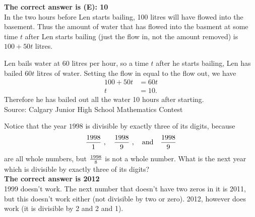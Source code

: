 \documentclass{article}
\begin{document}

\textbf{The correct answer is (E): 10}\\[1 ex]
In the two hours before Len starts bailing, 100 litres will have flowed into the basement. Thus the amount of water that has flowed into the basment at some time $t$ after Len starts bailing (just the flow in, not the amount removed) is $100+50t$ litres.

Len bails water at 60 litres per hour, so a time $t$ after he starts bailing, Len has bailed $60t$ litres of water. Setting the flow in equal to the flow out, we have
\begin{align*}
100+50t&=60t\\
t&=10.
\end{align*}
Therefore he has bailed out all the water 10 hours after starting.
\\[5 ex]

\scriptsize
Source: Calgary Junior High School Mathematics Contest

\normalsize
Notice that the year $1998$ is divisible by exactly three of its digits, because
$${1998\over 1}\ , \quad {1998\over 9}\ ,\quad \mbox{and}\quad
{1998\over 9}$$
are all whole numbers, but $
{1998\over 8}$ is not a whole number.
 What is the next year which is divisible by exactly three of its digits?\\


\textbf{The correct answer is 2012}\\[1 ex]
1999 doesn't work. The next number that doesn't have two zeros in it is 2011, but this doesn't work either (not divisible by two or zero). 2012, however does work (it is divisible by 2 and 2 and 1).
\\[5 ex]
\end{document}
